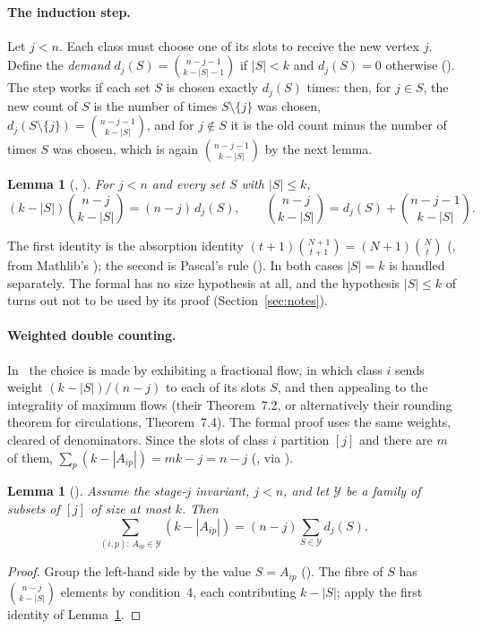 \documentclass[11pt]{article}
\newtheorem{lemma}[theorem]{Lemma}
\theoremstyle{definition}
\theoremstyle{remark}
\begin{document}
\paragraph{The induction step.} Let $j<n$. Each class must choose one of its slots to receive the
new vertex $j$. Define the \emph{demand} $d_j(S)=\binom{n-j-1}{k-|S|-1}$ if $|S|<k$ and
$d_j(S)=0$ otherwise (). The step works if each set $S$ is chosen exactly
$d_j(S)$ times: then, for $j\in S$, the new count of $S$ is the number of times $S\setminus\{j\}$
was chosen, $d_j(S\setminus\{j\})=\binom{n-j-1}{k-|S|}$, and for $j\notin S$ it is the old count
minus the number of times $S$ was chosen, which is again $\binom{n-j-1}{k-|S|}$ by the next lemma.

\begin{lemma}[, ]\label{lem:arith}
For $j<n$ and every set $S$ with $|S|\le k$,
\[(k-|S|)\binom{n-j}{k-|S|}=(n-j)\,d_j(S),\qquad
\binom{n-j}{k-|S|}=d_j(S)+\binom{n-j-1}{k-|S|}.\]
\end{lemma}
The first identity is the absorption identity $(t+1)\binom{N+1}{t+1}=(N+1)\binom Nt$
(, from Mathlib's ); the second is
Pascal's rule (). In both cases $|S|=k$ is handled separately. The
formal  has no size hypothesis at all, and the hypothesis $|S|\le k$ of
 turns out not to be used by its proof (Section~\ref{sec:notes}).

\paragraph{Weighted double counting.} In~\cite{vLW} the choice is made by exhibiting a fractional
flow, in which class $i$ sends weight $(k-|S|)/(n-j)$ to each of its slots $S$, and then appealing
to the integrality of maximum flows (their Theorem~7.2, or alternatively their rounding theorem
for circulations, Theorem~7.4). The formal proof uses the same
weights, cleared of denominators. Since the slots of class $i$ partition $[j]$ and there are $m$
of them, $\sum_p(k-|A_{ip}|)=mk-j=n-j$ (, via
).

\begin{lemma}[]\label{lem:wc}
Assume the stage-$j$ invariant, $j<n$, and let $\mathcal Y$ be a family of subsets of $[j]$ of size
at most $k$. Then
\[\sum_{(i,p):\,A_{ip}\in\mathcal Y}(k-|A_{ip}|)=(n-j)\sum_{S\in\mathcal Y}d_j(S).\]
\end{lemma}
\begin{proof}
Group the left-hand side by the value $S=A_{ip}$ (). The
fibre of $S$ has $\binom{n-j}{k-|S|}$ elements by condition~4, each contributing $k-|S|$; apply the
first identity of Lemma~\ref{lem:arith}.
\end{proof}
\end{document}
